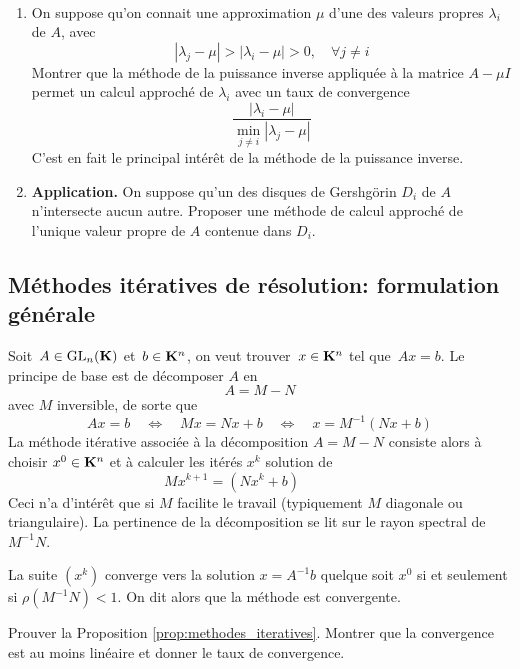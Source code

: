 \begin{exercice}\label{exo:puissance inverse}$ $
\begin{enumerate}
\item On suppose qu'on connait une approximation $\mu$ d'une des valeurs propres $\lambda_i$ de $A$, avec 
\[
|\lambda_j - \mu | > |\lambda_i - \mu| > 0, \quad \forall j \neq i
\]
Montrer que la méthode de la puissance inverse appliquée à la matrice $A-\mu I$ permet un calcul approché de $\lambda_i$ avec un taux de convergence
\[
\frac{|\lambda_i - \mu|}{\min_{j \neq i}|\lambda_j - \mu|}
\]
C'est en fait le principal intérêt de la méthode de la puissance inverse.
\item \textbf{Application.} On suppose qu'un des disques de Gershgörin $D_i$
de $A$ n'intersecte aucun autre. Proposer une méthode de calcul approché de
l'unique valeur propre de $A$ contenue dans $D_i$.
\end{enumerate}
\end{exercice}

\subsection{Méthodes itératives de résolution: formulation générale}

Soit~$A\in\mathrm{GL}_n(\mathbf{K})$ et~$b\in\mathbf{K}^n$, on veut trouver~$x\in\mathbf{K}^n$ tel
que~$Ax=b$.
Le principe de base est de décomposer $A$ en
\[
A = M - N
\]
avec $M$ inversible, de sorte que
\[
Ax = b \quad \Leftrightarrow \quad Mx = Nx + b \quad \Leftrightarrow \quad x = M^{-1}(Nx+b)
\]
La méthode itérative associée à la décomposition $A = M-N$ consiste alors à
choisir $x^0 \in \mathbf{K}^{n}$ et à calculer les itérés $x^k$ solution de
\[
Mx^{k+1} = (Nx^k + b)
\qquad\qquad
\]
Ceci n'a d'intérêt que si $M$ facilite le travail (typiquement $M$ diagonale ou triangulaire). La pertinence de la décomposition se lit sur le rayon spectral de $M^{-1}N$.

\begin{proposition}
\label{prop:methodes_iteratives}
La suite $(x^k)$ converge vers la solution $x=A^{-1}b$ quelque soit $x^0$ si
et seulement si $\rho(M^{-1}N) < 1$. On dit alors que la méthode est
convergente.
\end{proposition}

\begin{exercice}
Prouver la Proposition \ref{prop:methodes_iteratives}. Montrer que la
convergence est au moins linéaire et donner le taux de convergence.
\end{exercice}


